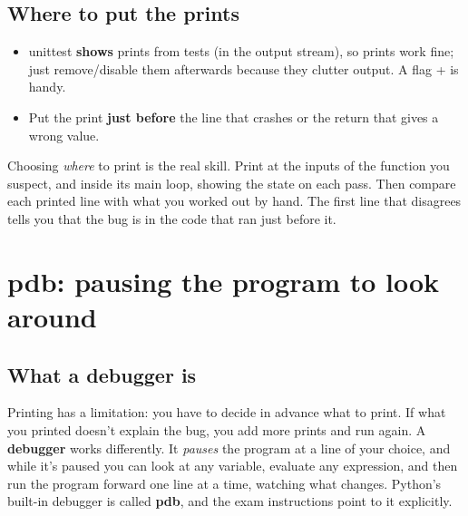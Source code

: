 \documentclass[10pt,a4paper]{article}
\begin{document}
\subsection{Where to put the prints}
\begin{itemize}
\item unittest \textbf{shows} prints from tests (in the output stream), so prints work fine; just remove/disable them afterwards because they clutter output. A  flag +  is handy.
\item Put the print \textbf{just before} the line that crashes or the return that gives a wrong value.
\end{itemize}
Choosing \emph{where} to print is the real skill. Print at the inputs of the function you suspect, and inside its main loop, showing the state on each pass. Then compare each printed line with what you worked out by hand. The first line that disagrees tells you that the bug is in the code that ran just before it.
\setcounter{section}{2}
\section{pdb: pausing the program to look around}
\subsection{What a debugger is}
Printing has a limitation: you have to decide in advance what to print. If what you printed doesn’t explain the bug, you add more prints and run again. A \textbf{debugger} works differently. It \emph{pauses} the program at a line of your choice, and while it’s paused you can look at any variable, evaluate any expression, and then run the program forward one line at a time, watching what changes. Python’s built-in debugger is called \textbf{pdb}, and the exam instructions point to it explicitly.
\end{document}
